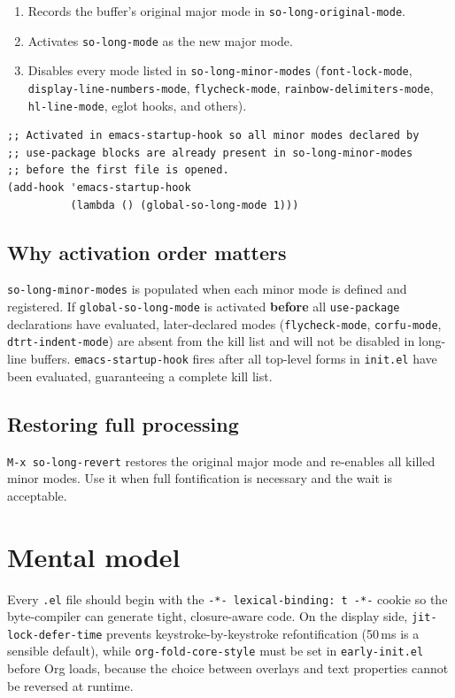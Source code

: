 \begin{enumerate}
\item Records the buffer's original major mode in \texttt{so-long-original-mode}.
\item Activates \texttt{so-long-mode} as the new major mode.
\item Disables every mode listed in \texttt{so-long-minor-modes} (\texttt{font-lock-mode}, \texttt{display-line-numbers-mode}, \texttt{flycheck-mode}, \texttt{rainbow-delimiters-mode}, \texttt{hl-line-mode}, eglot hooks, and others).
\end{enumerate}

\begin{verbatim}
;; Activated in emacs-startup-hook so all minor modes declared by
;; use-package blocks are already present in so-long-minor-modes
;; before the first file is opened.
(add-hook 'emacs-startup-hook
          (lambda () (global-so-long-mode 1)))
\end{verbatim}

\subsection{Why activation order matters}\label{why-activation-order-matters}

\texttt{so-long-minor-modes} is populated when each minor mode is defined and registered. If \texttt{global-so-long-mode} is activated \textbf{before} all \texttt{use-package} declarations have evaluated, later-declared modes (\texttt{flycheck-mode}, \texttt{corfu-mode}, \texttt{dtrt-indent-mode}) are absent from the kill list and will not be disabled in long-line buffers. \texttt{emacs-startup-hook} fires after all top-level forms in \texttt{init.el} have been evaluated, guaranteeing a complete kill list.

\subsection{Restoring full processing}\label{restoring-full-processing}

\texttt{M-x so-long-revert} restores the original major mode and re-enables all killed minor modes. Use it when full fontification is necessary and the wait is acceptable.

\section{Mental model}
Every \texttt{.el} file should begin with the
\texttt{-*- lexical-binding: t -*-} cookie so the byte-compiler can
generate tight, closure-aware code.  On the display side,
\texttt{jit-lock-defer-time} prevents keystroke-by-keystroke
refontification (50\,ms is a sensible default), while
\texttt{org-fold-core-style} must be set in \texttt{early-init.el}
before Org loads, because the choice between overlays and text
properties cannot be reversed at runtime.

